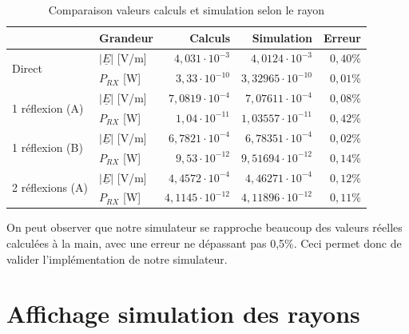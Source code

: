 \begin{table}[H]
    \centering
    \begin{tabular}{|l|l|r|r|r|}
         \hline
                                  & Grandeur & Calculs & Simulation & Erreur \\
        \hline
\multirow{2}{*}{Direct}           & $\left|\underline{E}\right|$ [V/m] & $4,031\cdot10^{-3}$ & $4,0124\cdot10^{-3}$ & $0,40\%$ \\
                                  & $P_{RX}$ [W] & $3,33\cdot10^{-10}$  & $3,32965\cdot10^{-10}$ & $0,01\%$     \\
        \hline
\multirow{2}{*}{1 réflexion (A)}  & $\left|\underline{E}\right|$ [V/m] & $7,0819\cdot10^{-4}$ & $7,07611\cdot10^{-4}$ & $0,08\%$ \\
                                  & $P_{RX}$ [W] & $1,04\cdot10^{-11}$ & $1,03557\cdot10^{-11}$ & $0,42\%$ \\
        \hline
\multirow{2}{*}{1 réflexion (B)}  & $\left|\underline{E}\right|$ [V/m] & $6,7821\cdot10^{-4}$ & $6,78351\cdot10^{-4}$ & $0,02\%$ \\
                                  & $P_{RX}$ [W] & $9,53\cdot10^{-12}$ & $9,51694\cdot10^{-12}$ & $0,14\%$ \\
        \hline
\multirow{2}{*}{2 réflexions (A)} & $\left|\underline{E}\right|$ [V/m] & $4,4572\cdot10^{-4}$ & $4,46271\cdot10^{-4}$ & $0,12\%$ \\
                                  & $P_{RX}$ [W] & $4,1145\cdot10^{-12}$ & $4,11896\cdot10^{-12}$ & $0,11\%$ \\
        \hline
    \end{tabular}
    \caption{Comparaison valeurs calculs et simulation selon le rayon}
    \label{tab:comparaison-calculs-simulation}
\end{table}

On peut observer que notre simulateur se rapproche beaucoup des valeurs réelles calculées à la main, avec une erreur ne dépassant pas 0,5\%. Ceci permet donc de valider l'implémentation de notre simulateur.

\section{Affichage simulation des rayons}

